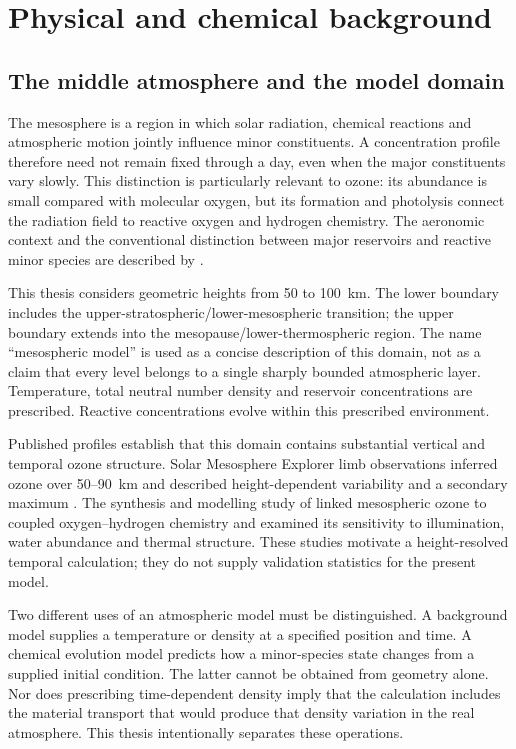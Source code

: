 \chapter{Physical and chemical background}\label{ch:background}
\section{The middle atmosphere and the model domain}
The mesosphere is a region in which solar radiation, chemical reactions and atmospheric motion jointly influence minor constituents. A concentration profile therefore need not remain fixed through a day, even when the major constituents vary slowly. This distinction is particularly relevant to ozone: its abundance is small compared with molecular oxygen, but its formation and photolysis connect the radiation field to reactive oxygen and hydrogen chemistry. The aeronomic context and the conventional distinction between major reservoirs and reactive minor species are described by \citet{brasseur2005}.

This thesis considers geometric heights from 50 to 100~km. The lower boundary includes the upper-stratospheric/lower-mesospheric transition; the upper boundary extends into the mesopause/lower-thermospheric region. The name ``mesospheric model'' is used as a concise description of this domain, not as a claim that every level belongs to a single sharply bounded atmospheric layer. Temperature, total neutral number density and reservoir concentrations are prescribed. Reactive concentrations evolve within this prescribed environment.

Published profiles establish that this domain contains substantial vertical and temporal ozone structure. Solar Mesosphere Explorer limb observations inferred ozone over 50--90~km and described height-dependent variability and a secondary maximum \citep{thomas1983}. The synthesis and modelling study of \citet{allen1984} linked mesospheric ozone to coupled oxygen--hydrogen chemistry and examined its sensitivity to illumination, water abundance and thermal structure. These studies motivate a height-resolved temporal calculation; they do not supply validation statistics for the present model.

Two different uses of an atmospheric model must be distinguished. A background model supplies a temperature or density at a specified position and time. A chemical evolution model predicts how a minor-species state changes from a supplied initial condition. The latter cannot be obtained from geometry alone. Nor does prescribing time-dependent density imply that the calculation includes the material transport that would produce that density variation in the real atmosphere. This thesis intentionally separates these operations.

